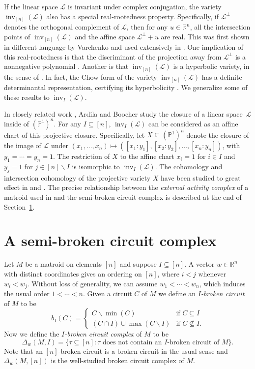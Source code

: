 \documentclass[ALCO,ThmDefs,Unicode,epreuves]{cedram}
\newcommand{\PP}{\mathbb{P}}
\newcommand{\R}{\mathbb{R}}
\newcommand{\cL}{\mathcal{L}}
\DeclareMathOperator{\inv}{inv}
\newcommand{\reldp}{\mathrel{:}}
\begin{document}
If the linear space $\cL$ is invariant under complex conjugation, the variety $\inv_{[n]}(\cL)$ also has a special real-rootedness 
property. Specifically, if $\cL^{\perp}$ denotes the orthogonal complement of $\cL$, then 
for any $u\in \R^n$, all the intersection points of $\inv_{[n]}(\cL)$ and the affine space $\cL^{\perp} + u$ are real. 
This was first shown in different language by Varchenko \cite{Var95} and used extensively in \cite{DLSV12}. 
One implication of this real-rootedness is that the discriminant of the projection away from $\cL^{\perp}$ is a nonnegative polynomial 
\cite{SSV13}. Another is that $\inv_{[n]}(\cL)$ is a hyperbolic variety, in the sense of \cite{SV}. 
In fact, the Chow form of the variety $\inv_{[n]}(\cL)$ has a definite determinantal representation, certifying its hyperbolicity \cite{KV}. 
We generalize some of these results to $\inv_I(\cL)$. 


In closely related work \cite{AB16}, Ardila and Boocher study the closure of a linear space~$\cL$ inside of $(\PP^1)^n$. 
For any $I\subseteq [n]$, $\inv_I(\cL)$ can be considered as an affine chart of this projective closure. 
Specifically, let $X \subseteq (\PP^1)^n$ denote the closure of the image of $\cL$ under $(x_1, \ldots , x_n)\mapsto ([x_1:y_1], [x_2:y_2], \ldots , [x_n:y_n])$, 
with $y_1 = \cdots = y_n = 1$. The restriction of $X$ to the affine chart $x_i = 1$ for $i\in I$ and $y_j = 1$ for $j\in [n]\backslash I$ 
is isomorphic to $\inv_I(\cL)$. 
The cohomology and intersection cohomology of the projective variety $X$ have been studied to great effect in \cite{HuhWang} and \cite{ProudfootXuYoung}.
The precise relationship between the \emph{external activity complex} of a matroid used in \cite{AB16} and the semi-broken circuit complex 
is described at the end of Section~\ref{sec:SimplicialComplex}. 


\section{A semi-broken circuit complex}\label{sec:SimplicialComplex}

Let $M$ be a matroid on elements $[n]$ and suppose $I \subseteq [n]$. 
A vector $w \in \R^n$ with distinct coordinates gives an ordering on $[n]$, where $i<j$ whenever $w_i< w_j$. 
Without loss of generality, we can assume $w_1< \cdots <w_n$, which induces the usual order $1<\cdots <n$. 
Given a circuit $C$ of $M$ we define an \emph{$I$-broken circuit} of $M$ to be 
\[
b_I(C)  =  
\begin{cases}
C\backslash\min(C) & \text{if }C \subseteq I \\
(C\cap I) \cup \max(C\backslash I) & \text{if }C \not\subseteq I.
\end{cases}
\]
Now we define the \emph{$I$-broken circuit complex} of $M$ to be 
\begin{equation}\label{eq:complexDef}
\Delta_w(M,I)  =  \{ \tau \subseteq [n] \reldp \tau \text{ does not contain an $I$-broken circuit of $M$}\}.
\end{equation}
Note that an $[n]$-broken circuit is a broken circuit in the usual sense and 
$\Delta_w(M,[n])$ is the well-studied broken circuit complex of $M$. 
\end{document}

